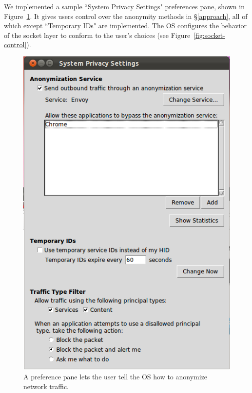 \documentclass{article}
\begin{document}
We implemented a sample ``System Privacy Settings" preferences pane, shown in Figure~\ref{fig:settings}. It gives users control over the anonymity methods in \S\ref{approach}, all of which except ``Temporary IDs" are implemented. The OS configures the behavior of the socket layer to conform to the user's choices (see Figure~\ref{fig:socket-control}).

\begin{figure}
\centering
\includegraphics[scale=0.75]{images/privacy-settings.png}
\caption{A preference pane lets the user tell the OS how to anonymize network traffic.}
\label{fig:settings}
\end{figure}
\end{document}
